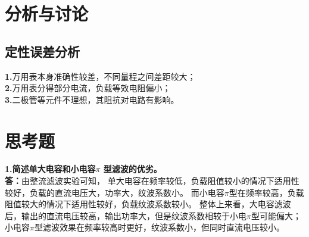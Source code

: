 \documentclass{article}
\def\kong{\hspace*{2em}}
\begin{document}
\section{分析与讨论}
    \subsection{定性误差分析}
        \kong \textbf{1.}万用表本身准确性较差，不同量程之间差距较大；\\
        \kong \textbf{2.}万用表分得部分电流，负载等效电阻偏小；\\
        \kong \textbf{3.}二极管等元件不理想，其阻抗对电路有影响。\\
\section{思考题}
    \kong \textbf{1.简述单大电容和小电容$\pi$ 型滤波的优劣。}\\
    \kong \textbf{答：}由整流滤波实验可知，
    单大电容在频率较低，负载阻值较小的情况下适用性较好，负载的直流电压大，功率大，纹波系数小。
    而小电容$\pi$型在频率较高，负载阻值较大的情况下适用性较好，负载纹波系数较小。
    整体上来看，大电容滤波后，输出的直流电压较高，输出功率大，但是纹波系数相较于小电$\pi$型可能偏大；
    小电容$\pi$型滤波效果在频率较高时更好，纹波系数小，但同时直流电压较小。
\end{document}
